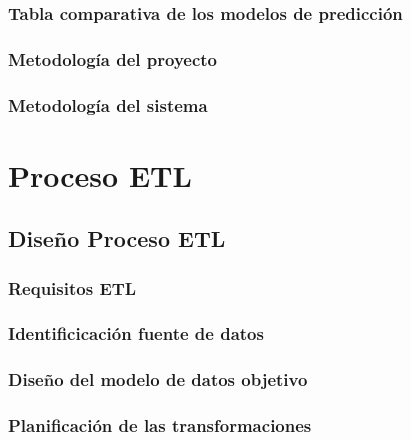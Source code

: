 \documentclass{report}
\begin{document}
\subsection{Tabla comparativa de los modelos de predicción}


\subsection{Metodología del proyecto}


\subsection{Metodología del sistema}


\chapter{Proceso ETL}

\section{Diseño Proceso ETL}


\subsection{Requisitos ETL}


\subsection{Identificicación fuente de datos}


\subsection{Diseño del modelo de datos objetivo}


\subsection{Planificación de las transformaciones}

\end{document}
